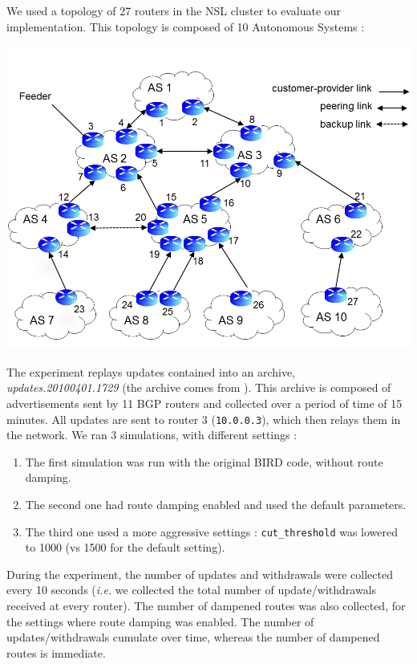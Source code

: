 \documentclass[a4paper,english]{IEEEtran}
\begin{document}
We used a topology of 27 routers in the NSL cluster to evaluate
our implementation.
This topology is composed of 10 Autonomous Systems :

\begin{center}
\includegraphics[scale=.3]{img/topology.png}
\end{center}

The experiment replays updates contained into an archive,
\textsl{updates.20100401.1729} (the archive comes from \cite{routeviews}).
This archive is composed of advertisements sent by 11 BGP routers and collected
over a period of time of 15 minutes.
All updates are sent to router 3 (\texttt{\small 10.0.0.3}), which then relays them
in the network.
We ran 3 simulations, with different settings :

\begin{enumerate}
\item The first simulation was run with the original BIRD code, without route damping.
\item The second one had route damping enabled and used the default parameters.
\item The third one used a more aggressive settings : \texttt{\small cut\_threshold} was lowered to 1000 (vs 1500 for the default setting).
\end{enumerate}

During the experiment, the number of updates and withdrawals were collected every 10 seconds (\textit{i.e.} we collected the total number of update/withdrawals received at every router).
The number of dampened routes was also collected, for the settings where route damping was enabled.
The number of updates/withdrawals cumulate over time, whereas the number of dampened routes is immediate.
\end{document}
